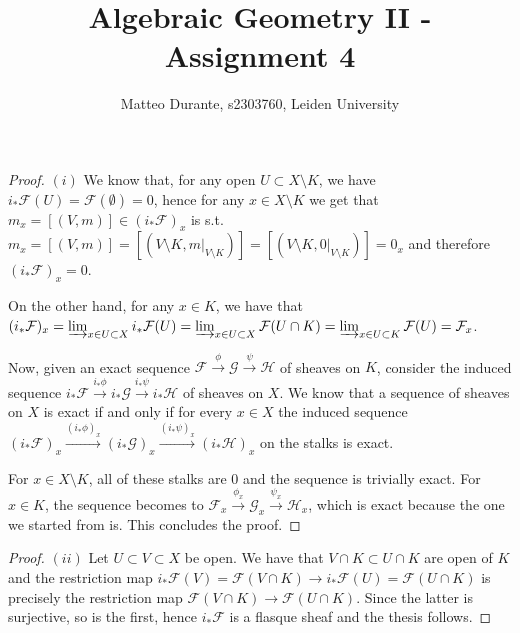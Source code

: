 \documentclass{article}
\newcommand{\exercise}[1]{\noindent {\bf Exercise #1}}
\begin{document}
\title{Algebraic Geometry II - Assignment 4}

\author{Matteo Durante, s2303760, Leiden University}

\maketitle


\exercise{1}

\begin{proof}
    $(i)$ We know that, for any open $U\subset X\setminus K$, we have
    $i_*\mathcal{F}(U)=\mathcal{F}(\emptyset)=0$, hence for any $x\in X\setminus
    K$ we get that $m_x=[(V,m)]\in (i_*\mathcal{F})_x$ is s.t. $m_x=[(V,m)]=
    [(V\setminus K,m|_{V\setminus K})]=[(V\setminus K,0|_{V\setminus K})]=0_x$
    and therefore $(i_*\mathcal{F})_x=0$.

    On the other hand, for any $x\in K$, we have that
    $(i_*\mathcal{F})_x=\varinjlim_{x\in U\subset X}i_*\mathcal{F}(U)=
    \varinjlim_{x\in U\subset X}\mathcal{F}(U\cap K)=\varinjlim_{x\in U\subset
    K}\mathcal{F}(U)=\mathcal{F}_x$.

    Now, given an exact sequence
    $\mathcal{F}\xrightarrow{\phi}\mathcal{G}\xrightarrow{\psi}\mathcal{H}$ of
    sheaves on $K$, consider the induced sequence
    $i_*\mathcal{F}\xrightarrow{i_*\phi}i_*\mathcal{G}\xrightarrow{i_*\psi}
    i_*\mathcal{H}$ of sheaves on $X$. We know that a sequence of sheaves on $X$
    is exact if and only if for every $x\in X$ the induced sequence
    $(i_*\mathcal{F})_x\xrightarrow{(i_*\phi)_x}(i_*\mathcal{G})_x
    \xrightarrow{(i_*\psi)_x}(i_*\mathcal{H})_x$ on the stalks is exact.

    For $x\in X\setminus K$, all of these stalks are 0 and the sequence is
    trivially exact. For $x\in K$, the sequence becomes to
    $\mathcal{F}_x\xrightarrow{\phi_x}\mathcal{G}_x\xrightarrow{\psi_x}
    \mathcal{H}_x$, which is exact because the one we started from is. This
    concludes the proof.
\end{proof}

\begin{proof}
    $(ii)$ Let $U\subset V\subset X$ be open. We have that $V\cap K\subset U\cap
    K$ are open of $K$ and the restriction map
    $i_*\mathcal{F}(V)=\mathcal{F}(V\cap K)\rightarrow
    i_*\mathcal{F}(U)=\mathcal{F}(U\cap K)$ is precisely the
    restriction map $\mathcal{F}(V\cap K)\rightarrow\mathcal{F}(U\cap K)$. Since
    the latter is surjective, so is the first, hence $i_*\mathcal{F}$ is a
    flasque sheaf and the thesis follows.
\end{proof}
\end{document}
